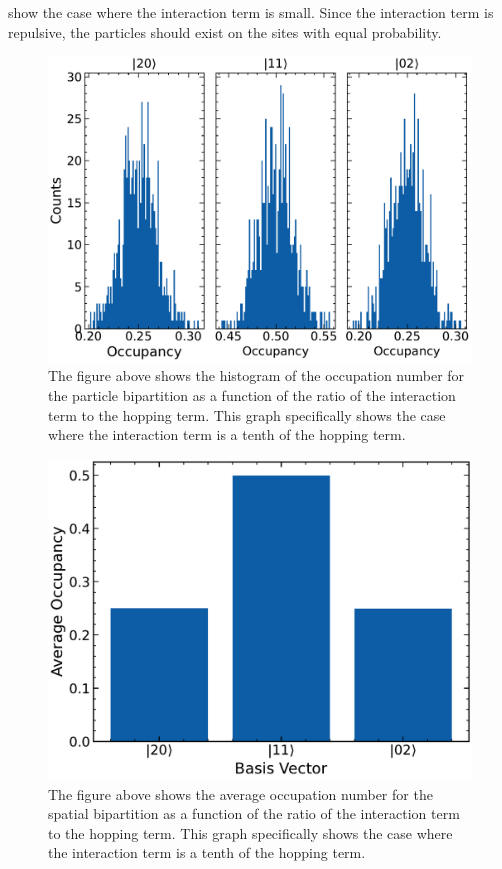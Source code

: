  show the case where the interaction term is small. Since the interaction term is repulsive, the particles should exist on the sites with equal probability.

\begin{figure}[H]
\centering
\includegraphics[scale=0.5]{../figures/sep_occ_hist_U_0.0001.pdf}
\caption{The figure above shows the histogram of the occupation number for the particle bipartition as a function of the ratio of the interaction term to the hopping term. This graph specifically shows the case where the interaction term is a tenth of the hopping term.}
\label{fig:sep_occ_hist_U_0.0001}
\end{figure}

\begin{figure}[H]
\centering
\includegraphics[scale=0.5]{../figures/spatial_avg_occ_U_0.0001.pdf}
\caption{The figure above shows the average occupation number for the spatial bipartition as a function of the ratio of the interaction term to the hopping term. This graph specifically shows the case where the interaction term is a tenth of the hopping term.}
\label{fig:spatial_avg_occ_U_0.0001}
\end{figure}

